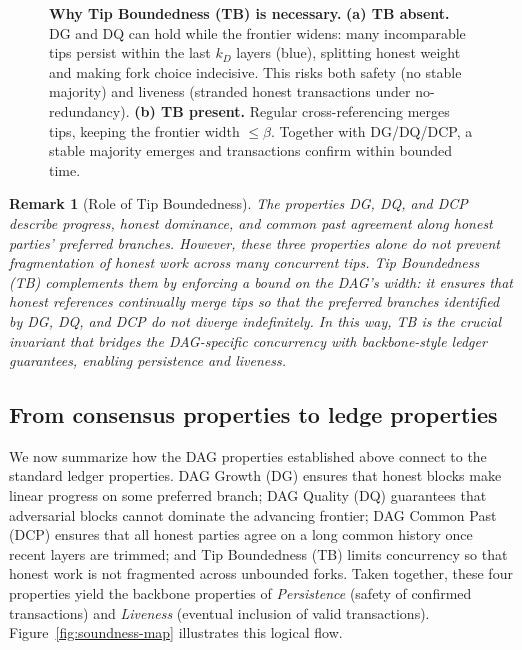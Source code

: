 \documentclass[11pt]{article}
\newtheorem{remark}[theorem]{Remark}
\begin{document}
\begin{figure}[htp!]
\caption{\textbf{Why Tip Boundedness (TB) is necessary.}
\small
\textbf{(a) TB absent.} DG and DQ can hold while the frontier widens: many incomparable tips persist
within the last $k_D$ layers (blue), splitting honest weight and making fork choice indecisive. This risks
both safety (no stable majority) and liveness (stranded honest transactions under no-redundancy).
\textbf{(b) TB present.} Regular cross-referencing merges tips, keeping the frontier width $\le \beta$.
Together with DG/DQ/DCP, a stable majority emerges and transactions confirm within bounded time.}
\label{fig:tb-necessity}
\end{figure}



\begin{remark}[Role of Tip Boundedness]
The properties DG, DQ, and DCP describe progress, 
honest dominance, and common past agreement along honest parties’ preferred branches. 
However, these three properties alone do not prevent fragmentation of honest work 
across many concurrent tips. 
Tip Boundedness (TB) complements them by enforcing a bound on the DAG’s width: 
it ensures that honest references continually merge tips so that the preferred branches 
identified by DG, DQ, and DCP do not diverge indefinitely. 
In this way, TB is the crucial invariant that bridges the DAG-specific concurrency 
with backbone-style ledger guarantees, enabling persistence and liveness.
\end{remark}


\subsection{From consensus properties to ledge properties} 
We now summarize how the DAG properties established above connect to the standard ledger
properties. DAG Growth (DG) ensures that honest blocks make linear progress on some preferred
branch; DAG Quality (DQ) guarantees that adversarial blocks cannot dominate the advancing
frontier; DAG Common Past (DCP) ensures that all honest parties agree on a long common
history once recent layers are trimmed; and Tip Boundedness (TB) limits concurrency so that
honest work is not fragmented across unbounded forks. Taken together, these four properties
yield the backbone properties of \emph{Persistence} (safety of confirmed transactions) and
\emph{Liveness} (eventual inclusion of valid transactions). Figure~\ref{fig:soundness-map}
illustrates this logical flow.
\end{document}
